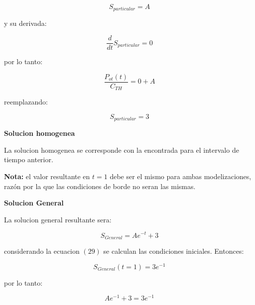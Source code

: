 \documentclass[a4paper,12pt]{article}
\begin{document}
\begin{equation}
S_{particular}=A
\end{equation}

\newpage

y su derivada:

\begin{equation}
\frac{d}{dt}S_{particular}=0
\end{equation}

por lo tanto:\par

\begin{equation}
\frac{P_{ot}(t)}{C_{TH}}=0+A
\end{equation}

reemplazando:\par

\begin{equation}
S_{particular}=3
\end{equation}

\vspace*{0.2in}

\textbf{Solucion homogenea}\par
\vspace*{0.2in}
La solucion homogenea se corresponde con la encontrada para el intervalo de tiempo anterior.\par

\vspace*{0.2in}
\textbf{Nota:} el valor resultante en $t=1$ debe ser el mismo para ambas modelizaciones, razón por la que las condiciones de borde no seran las mismas.

\vspace*{0.3in}
\textbf{Solucion General}\par
\vspace*{0.2in}

La solucion general resultante sera:\par

\begin{equation}
S_{General}=A e^{-t} + 3
\end{equation}

considerando la ecuacion $(29)$ se calculan las condiciones iniciales. Entonces:

\begin{equation}
S_{General}(t=1)=3e^{-1}
\end{equation}

por lo tanto:

\begin{equation}
Ae^{-1} +3 = 3e^{-1} 
\end{equation}
\end{document}
